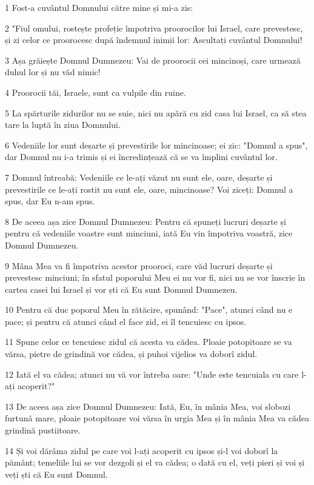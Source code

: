 \par 1 Fost-a cuvântul Domnului către mine și mi-a zis:
\par 2 "Fiul omului, rostește profeție împotriva proorocilor lui Israel, care prevestesc, și zi celor ce proorocesc după îndemnul inimii lor: Ascultați cuvântul Domnului!
\par 3 Așa grăiește Domnul Dumnezeu: Vai de proorocii cei mincinoși, care urmează duhul lor și nu văd nimic!
\par 4 Proorocii tăi, Israele, sunt ca vulpile din ruine.
\par 5 La spărturile zidurilor nu se suie, nici nu apără cu zid casa lui Israel, ca să stea tare la luptă în ziua Domnului.
\par 6 Vedeniile lor sunt deșarte și prevestirile lor mincinoase; ei zic: "Domnul a spus", dar Domnul nu i-a trimis și ei încredințează că se va împlini cuvântul lor.
\par 7 Domnul întreabă: Vedeniile ce le-ați văzut nu sunt ele, oare, deșarte și prevestirile ce le-ați rostit nu sunt ele, oare, mincinoase? Voi ziceți: Domnul a spus, dar Eu n-am spus.
\par 8 De aceea așa zice Domnul Dumnezeu: Pentru că spuneți lucruri deșarte și pentru că vedeniile voastre sunt minciuni, iată Eu vin împotriva voastră, zice Domnul Dumnezeu.
\par 9 Mâna Mea va fi împotriva acestor prooroci, care văd lucruri deșarte și prevestesc minciuni; în sfatul poporului Meu ei nu vor fi, nici nu se vor înscrie în cartea casei lui Israel și vor ști că Eu sunt Domnul Dumnezeu.
\par 10 Pentru că duc poporul Meu în rătăcire, spunând: "Pace", atunci când nu e pace; și pentru că atunci când el face zid, ei îl tencuiesc cu ipsos.
\par 11 Spune celor ce tencuiesc zidul că acesta va cădea. Ploaie potopitoare se va vărsa, pietre de grindină vor cădea, și puhoi vijelios va doborî zidul.
\par 12 Iată el va cădea; atunci nu vă vor întreba oare: "Unde este tencuiala cu care l-ați acoperit?"
\par 13 De aceea așa zice Domnul Dumnezeu: Iată, Eu, în mânia Mea, voi slobozi furtună mare, ploaie potopitoare voi vărsa în urgia Mea și în mânia Mea va cădea grindină pustiitoare.
\par 14 Și voi dărâma zidul pe care voi l-ați acoperit cu ipsos și-l voi doborî la pământ; temeliile lui se vor dezgoli și el va cădea; o dată cu el, veți pieri și voi și veți ști că Eu sunt Domnul.

